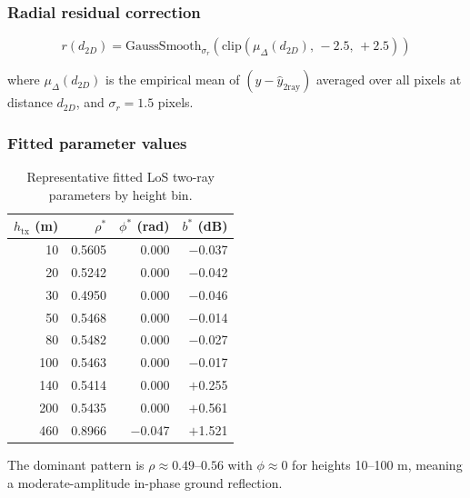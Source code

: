 \subsubsection{Radial residual correction}

\begin{equation}
r(d_{2D}) = \mathrm{GaussSmooth}_{\sigma_r}\!\left(\mathrm{clip}\!\left(\mu_{\Delta}(d_{2D}),\,-2.5,\,+2.5\right)\right)
\end{equation}

where $\mu_{\Delta}(d_{2D})$ is the empirical mean of $(y - \hat y_{\mathrm{2ray}})$ averaged over all pixels at distance $d_{2D}$, and $\sigma_r = 1.5$ pixels.

\subsubsection{Fitted parameter values}

\begin{table}[H]
\centering
\caption{Representative fitted LoS two-ray parameters by height bin.}
\label{tab:los_params}
\small
\begin{tabular}{rrrr}
\toprule
$h_{\mathrm{tx}}$ (m) & $\rho^*$ & $\phi^*$ (rad) & $b^*$ (dB)\\
\midrule
10  & 0.5605 & 0.000 & $-$0.037 \\
20  & 0.5242 & 0.000 & $-$0.042 \\
30  & 0.4950 & 0.000 & $-$0.046 \\
50  & 0.5468 & 0.000 & $-$0.014 \\
80  & 0.5482 & 0.000 & $-$0.027 \\
100 & 0.5463 & 0.000 & $-$0.017 \\
140 & 0.5414 & 0.000 & $+$0.255 \\
200 & 0.5435 & 0.000 & $+$0.561 \\
460 & 0.8966 & $-$0.047 & $+$1.521 \\
\bottomrule
\end{tabular}
\end{table}

The dominant pattern is $\rho \approx 0.49$--$0.56$ with $\phi \approx 0$ for heights 10--100 m, meaning a moderate-amplitude in-phase ground reflection.

